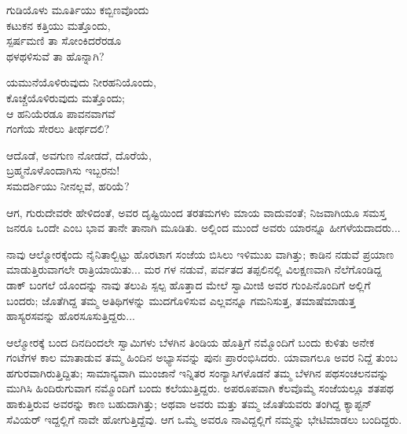 \begin{myquote}
ಗುಡಿಯೊಳು ಮೂರ್ತಿಯು ಕಬ್ಬಿಣವೊಂದು\\ಕಟುಕನ ಕತ್ತಿಯು ಮತ್ತೊಂದು,\\ಸ್ಪರ್ಷಮಣಿ ತಾ ಸೋಂಕಿದರೆರಡೂ\\ಥಳಥಳಿಸುವೆ ತಾ ಹೊನ್ನಾಗಿ?
\end{myquote}

\begin{myquote}
ಯಮುನೆಯೊಳಿರುವುದು ನೀರಹನಿಯೊಂದು,\\ಕೊಚ್ಚೆಯೊಳಿರುವುದು ಮತ್ತೊಂದು;\\ಆ ಹನಿಯೆರಡೂ ಪಾವನವಾಗವೆ\\ಗಂಗೆಯ ಸೇರಲು ತೀರ್ಥದಲಿ?
\end{myquote}

\begin{myquote}
ಆದೊಡೆ, ಅವಗುಣ ನೋಡದೆ, ದೊರೆಯೆ,\\ಬ್ರಹ್ಮನೊಳೊಂದಾಗಿಸು ಇಬ್ಬರನು!\\ಸಮದರ್ಶಿಯು ನೀನಲ್ಲವೆ, ಹರಿಯೆ?
\end{myquote}

ಆಗ, ಗುರುದೇವರೇ ಹೇಳಿದಂತೆ, ಅವರ ದೃಷ್ಟಿಯಿಂದ ತರತಮಗಳು ಮಾಯ ವಾದುವಂತೆ; ನಿಜವಾಗಿಯೂ ಸಮಸ್ತ ಜನರೂ ಒಂದೇ ಎಂಬ ಭಾವ ತಾನೇ ತಾನಾಗಿ ಮೂಡಿತು. ಅಲ್ಲಿಂದ ಮುಂದೆ ಅವರು ಯಾರನ್ನೂ ಹೀಗಳೆಯದಾದರು...

ನಾವು ಆಲ್ಮೋರಕ್ಕೆಂದು ನೈನಿತಾಲ್ಬಿಟ್ಟು ಹೊರಟಾಗ ಸಂಜೆಯ ಬಿಸಿಲು ಇಳಿಮುಖ ವಾಗಿತ್ತು; ಕಾಡಿನ ನಡುವೆ ಪ್ರಯಾಣ ಮಾಡುತ್ತಿರುವಾಗಲೇ ರಾತ್ರಿಯಾಯಿತು... ಮರ ಗಳ ನಡುವೆ, ಪರ್ವತದ ತಪ್ಪಲಿನಲ್ಲಿ ವಿಲಕ್ಷಣವಾಗಿ ನೆಲೆಗೊಂಡಿದ್ದ ಡಾಕ್ ಬಂಗಲೆ ಯೊಂದನ್ನು ನಾವು ತಲುಪಿ ಸ್ಪಲ್ಪ ಹೊತ್ತಾದ ಮೇಲೆ ಸ್ವಾಮೀಜಿ ಅವರ ಗುಂಪಿನೊಂದಿಗೆ ಅಲ್ಲಿಗೆ ಬಂದರು; ಜೊತೆಗಿದ್ದ ತಮ್ಮ ಅತಿಥಿಗಳನ್ನು ಮುದಗೊಳಿಸುವ ಎಲ್ಲವನ್ನೂ ಗಮನಿಸುತ್ತ, ತಮಾಷೆಮಾಡುತ್ತ ಹಾಸ್ಯರಸವನ್ನು ಹೊರಸೂಸುತ್ತಿದ್ದರು...

ಆಲ್ಮೋರಕ್ಕೆ ಬಂದ ದಿನದಿಂದಲೇ ಸ್ವಾಮಿಗಳು ಬೆಳಗಿನ ತಿಂಡಿಯ ಹೊತ್ತಿಗೆ ನಮ್ಮೊಂದಿಗೆ ಬಂದು ಕುಳಿತು ಅನೇಕ ಗಂಟೆಗಳ ಕಾಲ ಮಾತಾಡುವ ತಮ್ಮ ಹಿಂದಿನ ಅಭ್ಯಾಸವನ್ನು ಪುನಃ ಪ್ರಾರಂಭಿಸಿದರು. ಯಾವಾಗಲೂ ಅವರ ನಿದ್ದೆ ತುಂಬ ಹಗುರವಾಗಿರುತ್ತಿದ್ದಿತು; ಸಾಮಾನ್ಯವಾಗಿ ಮುಂಜಾನೆ ಇನ್ನಿತರ ಸಂನ್ಯಾಸಿಗಳೊಡನೆ ತಮ್ಮ ಬೆಳಗಿನ ಪಥಸಂಚಲನವನ್ನು ಮುಗಿಸಿ ಹಿಂದಿರುಗುವಾಗ ನಮ್ಮೊಂದಿಗೆ ಬಂದು ಕಲೆಯುತ್ತಿದ್ದರು. ಅಪರೂಪವಾಗಿ ಕೆಲವೊಮ್ಮೆ ಸಂಜೆಯಲ್ಲೂ ಶತಪಥ ಹಾಕುತ್ತಿರುವ ಅವರನ್ನು ಕಾಣ ಬಹುದಾಗಿತ್ತು; ಅಥವಾ ಅವರು ಮತ್ತು ತಮ್ಮ ಜೊತೆಯವರು ತಂಗಿದ್ದ ಕ್ಯಾಪ್ಟನ್ ಸೆವಿಯರ್ ಇದ್ದಲ್ಲಿಗೆ ನಾವೇ ಹೋಗುತ್ತಿದ್ದೆವು. ಆಗ ಒಮ್ಮೆ ಅವರೂ ನಾವಿದ್ದಲ್ಲಿಗೆ ನಮ್ಮನ್ನು ಭೇಟಿಮಾಡಲು ಬಂದಿದ್ದರು.

